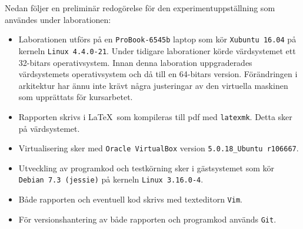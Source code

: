 Nedan följer en preliminär redogörelse för den experimentuppställning som
användes under laborationen:

\begin{itemize}
  \item Laborationen utförs på en \texttt{ProBook-6545b} laptop som kör
        \texttt{Xubuntu 16.04} på kerneln \texttt{Linux 4.4.0-21}.  Under
        tidigare laborationer körde värdsystemet ett 32-bitars operativsystem.
        Innan denna laboration uppgraderades värdsystemets operativsystem och
        då till en 64-bitars version. Förändringen i arkitektur har ännu inte
        krävt några justeringar av den virtuella maskinen som upprättats för
        kursarbetet.

  \item Rapporten skrivs i \LaTeX\  som kompileras till pdf med \texttt{latexmk}.
        Detta sker på värdsystemet.

  \item Virtualisering sker med \texttt{Oracle VirtualBox} version
        \texttt{5.0.18\_Ubuntu r106667}.

  \item Utveckling av programkod och testkörning sker i gästsystemet som kör
        \texttt{Debian 7.3 (jessie)} på kerneln \texttt{Linux 3.16.0-4}.

  \item Både rapporten och eventuell kod skrivs med texteditorn \texttt{Vim}.

  \item För versionshantering av både rapporten och programkod används \texttt{Git}.



\end{itemize}


